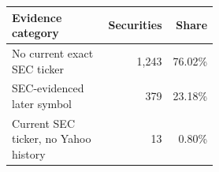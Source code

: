{\small
\begin{tabular}{@{}p{0.52\linewidth}rr@{}}
\toprule
Evidence category & Securities & Share \\
\midrule
No current exact SEC ticker & 1,243 & 76.02\% \\
SEC-evidenced later symbol & 379 & 23.18\% \\
Current SEC ticker, no Yahoo history & 13 & 0.80\% \\
\bottomrule
\end{tabular}
}
